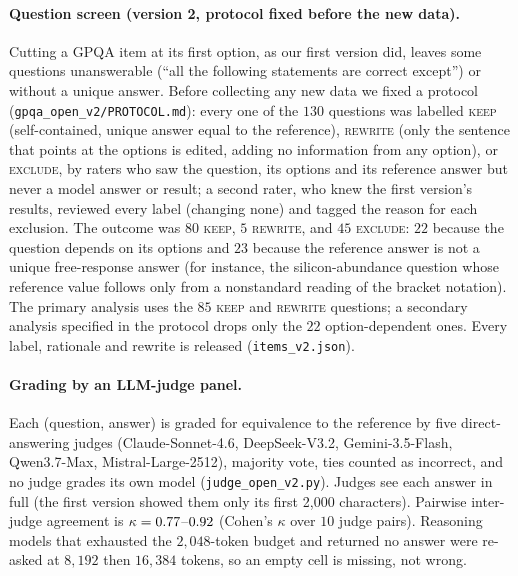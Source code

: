 \documentclass[11pt]{article}
\theoremstyle{plain}
\theoremstyle{definition}
\begin{document}
\paragraph{Question screen (version 2, protocol fixed before the new data).} Cutting a GPQA item at its first option, as our first version did,
leaves some questions unanswerable (``all the following statements are correct except'') or without a unique answer. Before
collecting any new data we fixed a protocol (\texttt{gpqa\_open\_v2/PROTOCOL.md}): every one of the $130$ questions was labelled
\textsc{keep} (self-contained, unique answer equal to the reference), \textsc{rewrite} (only the sentence that points at the
options is edited, adding no information from any option), or \textsc{exclude}, by raters who saw the question, its options and
its reference answer but never a model answer or result; a second rater, who knew the first version's results, reviewed
every label (changing none) and tagged the reason for each exclusion. The outcome was $80$
\textsc{keep}, $5$ \textsc{rewrite}, and $45$ \textsc{exclude}: $22$ because the question depends on its options and $23$ because
the reference answer is not a unique free-response answer (for instance, the silicon-abundance question whose reference value
follows only from a nonstandard reading of the bracket notation). The primary analysis uses the $85$ \textsc{keep} and
\textsc{rewrite} questions; a secondary analysis specified in the protocol drops only the $22$ option-dependent ones. Every label, rationale
and rewrite is released (\texttt{items\_v2.json}).

\paragraph{Grading by an LLM-judge panel.} Each (question, answer) is graded for equivalence to the reference by five
direct-answering judges (Claude-Sonnet-4.6, DeepSeek-V3.2, Gemini-3.5-Flash, Qwen3.7-Max, Mistral-Large-2512), majority vote,
ties counted as incorrect, and no judge grades its own model (\texttt{judge\_open\_v2.py}). Judges see each answer in full (the
first version showed them only its first 2{,}000 characters). Pairwise inter-judge agreement is $\kappa=0.77$--$0.92$
(Cohen's $\kappa$ over $10$ judge pairs). Reasoning models that exhausted the $2{,}048$-token budget and returned no answer were
re-asked at $8{,}192$ then $16{,}384$ tokens, so an empty cell is missing, not wrong.
\end{document}
